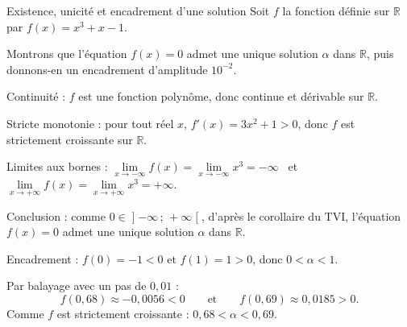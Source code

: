 \documentclass[11pt,a4paper]{article}
\newcommand{\R}{\mathbb{R}}
\newcommand{\intoo}[2]{\mathopen{]}#1\,;\,#2\mathclose{[}}
\newcommand{\limite}[2]{\lim\limits_{#1}#2}
\begin{document}
\begin{exemple}{Existence, unicité et encadrement d'une solution}{}
Soit $f$ la fonction définie sur $\R$ par $f(x)=x^3+x-1$.

Montrons que l'équation $f(x)=0$ admet une unique solution $\alpha$ dans $\R$,
puis donnons-en un encadrement d'amplitude $10^{-2}$.

\begin{etapes}
  \item Continuité : $f$ est une fonction polynôme, donc continue et dérivable
        sur $\R$.
  \item Stricte monotonie : pour tout réel $x$, $f'(x)=3x^2+1>0$, donc $f$ est
        strictement croissante sur $\R$.
  \item Limites aux bornes :
        $\limite{x\to-\infty}{f(x)}=\limite{x\to-\infty}{x^3}=-\infty$ \ et \
        $\limite{x\to+\infty}{f(x)}=\limite{x\to+\infty}{x^3}=+\infty$.

\begin{center}
\end{center}

  \item Conclusion : comme $0\in\intoo{-\infty}{+\infty}$, d'après le corollaire
        du TVI, l'équation $f(x)=0$ admet une unique solution $\alpha$ dans $\R$.
  \item Encadrement : $f(0)=-1<0$ et $f(1)=1>0$, donc $0<\alpha<1$.

        Par balayage avec un pas de $0{,}01$ :
        \[
          f(0{,}68)\approx -0{,}0056<0 \qquad\text{et}\qquad
          f(0{,}69)\approx 0{,}0185>0.
        \]
        Comme $f$ est strictement croissante : $\boxed{0{,}68<\alpha<0{,}69}$.
\end{etapes}
\end{exemple}
\end{document}
